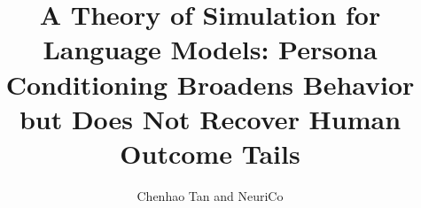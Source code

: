 \documentclass{article}
\title{A Theory of Simulation for Language Models: Persona Conditioning Broadens Behavior but Does Not Recover Human Outcome Tails}
\author{Chenhao Tan and NeuriCo}
\begin{document}
\maketitle

\begin{abstract}

\end{abstract}









\end{document}
